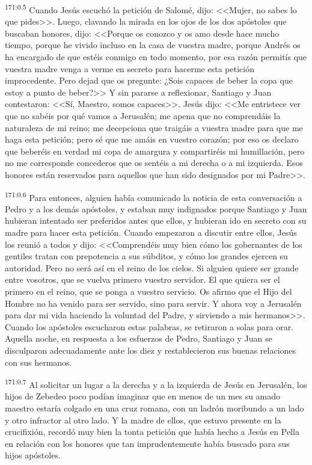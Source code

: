 \par 
\textsuperscript{171:0.5} Cuando Jesús escuchó la petición de Salomé, dijo: <<Mujer, no sabes lo que pides>>. Luego, clavando la mirada en los ojos de los dos apóstoles que buscaban honores, dijo: <<Porque os conozco y os amo desde hace mucho tiempo, porque he vivido incluso en la casa de vuestra madre, porque Andrés os ha encargado de que estéis conmigo en todo momento, por esa razón permitís que vuestra madre venga a verme en secreto para hacerme esta petición improcedente. Pero dejad que os pregunte: ¿Sois capaces de beber la copa que estoy a punto de beber?>> Y sin pararse a reflexionar, Santiago y Juan contestaron: <<Sí, Maestro, somos capaces>>. Jesús dijo: <<Me entristece ver que no sabéis por qué vamos a Jerusalén; me apena que no comprendáis la naturaleza de mi reino; me decepciona que traigáis a vuestra madre para que me haga esta petición; pero sé que me amáis en vuestro corazón; por eso os declaro que beberéis en verdad mi copa de amargura y compartiréis mi humillación, pero no me corresponde concederos que os sentéis a mi derecha o a mi izquierda. Esos honores están reservados para aquellos que han sido designados por mi Padre>>.

\par 
\textsuperscript{171:0.6} Para entonces, alguien había comunicado la noticia de esta conversación a Pedro y a los demás apóstoles, y estaban muy indignados porque Santiago y Juan hubieran intentado ser preferidos antes que ellos, y hubieran ido en secreto con su madre para hacer esta petición. Cuando empezaron a discutir entre ellos, Jesús los reunió a todos y dijo: <<Comprendéis muy bien cómo los gobernantes de los gentiles tratan con prepotencia a sus súbditos, y cómo los grandes ejercen su autoridad. Pero no será así en el reino de los cielos. Si alguien quiere ser grande entre vosotros, que se vuelva primero vuestro servidor. El que quiera ser el primero en el reino, que se ponga a vuestro servicio. Os afirmo que el Hijo del Hombre no ha venido para ser servido, sino para servir. Y ahora voy a Jerusalén para dar mi vida haciendo la voluntad del Padre, y sirviendo a mis hermanos>>. Cuando los apóstoles escucharon estas palabras, se retiraron a solas para orar. Aquella noche, en respuesta a los esfuerzos de Pedro, Santiago y Juan se disculparon adecuadamente ante los diez y restablecieron sus buenas relaciones con sus hermanos.

\par 
\textsuperscript{171:0.7} Al solicitar un lugar a la derecha y a la izquierda de Jesús en Jerusalén, los hijos de Zebedeo poco podían imaginar que en menos de un mes su amado maestro estaría colgado en una cruz romana, con un ladrón moribundo a un lado y otro infractor al otro lado. Y la madre de ellos, que estuvo presente en la crucifixión, recordó muy bien la tonta petición que había hecho a Jesús en Pella en relación con los honores que tan imprudentemente había buscado para sus hijos apóstoles.

